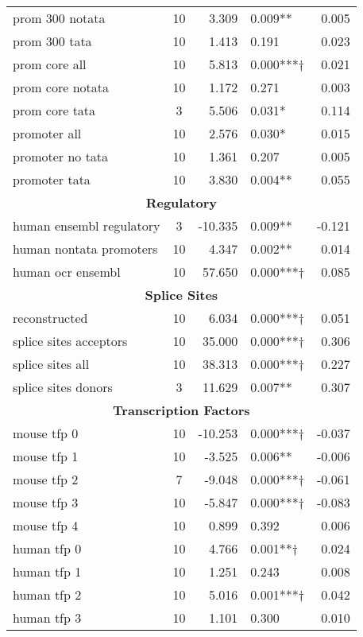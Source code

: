 \begin{table}[]
\begin{center}
\begin{tabular}{@{}lcrlr@{}}
prom 300 notata & 10 & 3.309 & 0.009** & 0.005 \\
prom 300 tata & 10 & 1.413 & 0.191 & 0.023 \\
\rowcolor{teal!25}prom core all & 10 & 5.813 & 0.000***† & 0.021 \\
prom core notata & 10 & 1.172 & 0.271 & 0.003 \\
prom core tata & 3 & 5.506 & 0.031* & 0.114 \\
promoter all & 10 & 2.576 & 0.030* & 0.015 \\
promoter no tata & 10 & 1.361 & 0.207 & 0.005 \\
promoter tata & 10 & 3.830 & 0.004** & 0.055 \\
\midrule
\multicolumn{5}{c}{\textbf{Regulatory}} \\
\midrule
human ensembl regulatory & 3 & -10.335 & 0.009** & -0.121 \\
human nontata promoters & 10 & 4.347 & 0.002** & 0.014 \\
\rowcolor{teal!25}human ocr ensembl & 10 & 57.650 & 0.000***† & 0.085 \\
\midrule
\multicolumn{5}{c}{\textbf{Splice Sites}} \\
\midrule
\rowcolor{teal!25}reconstructed & 10 & 6.034 & 0.000***† & 0.051 \\
\rowcolor{teal!25}splice sites acceptors & 10 & 35.000 & 0.000***† & 0.306 \\
\rowcolor{teal!25}splice sites all & 10 & 38.313 & 0.000***† & 0.227 \\
splice sites donors & 3 & 11.629 & 0.007** & 0.307 \\
\midrule
\multicolumn{5}{c}{\textbf{Transcription Factors}} \\
\midrule
\rowcolor{magenta!25}mouse tfp 0 & 10 & -10.253 & 0.000***† & -0.037 \\
mouse tfp 1 & 10 & -3.525 & 0.006** & -0.006 \\
\rowcolor{magenta!25}mouse tfp 2 & 7 & -9.048 & 0.000***† & -0.061 \\
\rowcolor{magenta!25}mouse tfp 3 & 10 & -5.847 & 0.000***† & -0.083 \\
mouse tfp 4 & 10 & 0.899 & 0.392 & 0.006 \\
\rowcolor{teal!25}human tfp 0 & 10 & 4.766 & 0.001**† & 0.024 \\
human tfp 1 & 10 & 1.251 & 0.243 & 0.008 \\
\rowcolor{teal!25}human tfp 2 & 10 & 5.016 & 0.001***† & 0.042 \\
human tfp 3 & 10 & 1.101 & 0.300 & 0.010 \\

\end{tabular}
\end{center}
\end{table}
